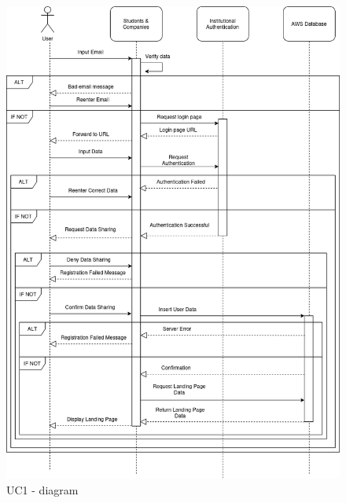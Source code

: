 \begin{itemize}[label={[\textbf{UC}]}, align=left, leftmargin=*]
    \begin{figure}[H]
    	\includegraphics[width=\textwidth,height=\textheight,keepaspectratio]{RASD-Latex/assets/Use Case Diagrams/UC1.png}
    	\caption{UC1 - diagram}
    	\label{fig:DataRequest}
    \end{figure}


\end{itemize}
